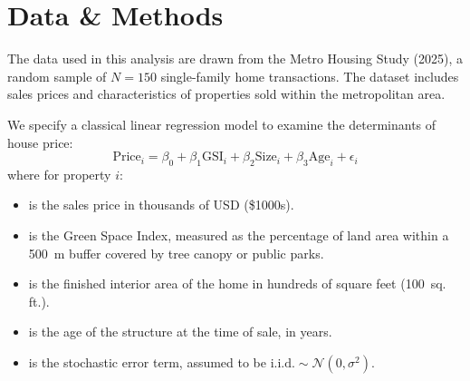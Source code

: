 \section{Data \& Methods}
The data used in this analysis are drawn from the Metro Housing Study (2025), a random sample of $N = \num{150}$ single-family home transactions. The dataset includes sales prices and characteristics of properties sold within the metropolitan area.

We specify a classical linear regression model to examine the determinants of house price:
\begin{equation}
\text{Price}_i = \beta_0 + \beta_1 \text{GSI}_i + \beta_2 \text{Size}_i + \beta_3 \text{Age}_i + \epsilon_i
\end{equation}
where for property $i$:
\begin{itemize}[leftmargin=1.2cm, noitemsep]
    \item[\textbf{Price}] is the sales price in thousands of USD (\$\num{1000}s).
    \item[\textbf{GSI}] is the Green Space Index, measured as the percentage of land area within a \qty{500}{\metre} buffer covered by tree canopy or public parks.
    \item[\textbf{Size}] is the finished interior area of the home in hundreds of square feet (\num{100}~sq.\,ft.).
    \item[\textbf{Age}] is the age of the structure at the time of sale, in years.
    \item[\textbf{$\epsilon$}] is the stochastic error term, assumed to be $\text{i.i.d.} \sim \mathcal{N}(0, \sigma^2)$.
\end{itemize}
